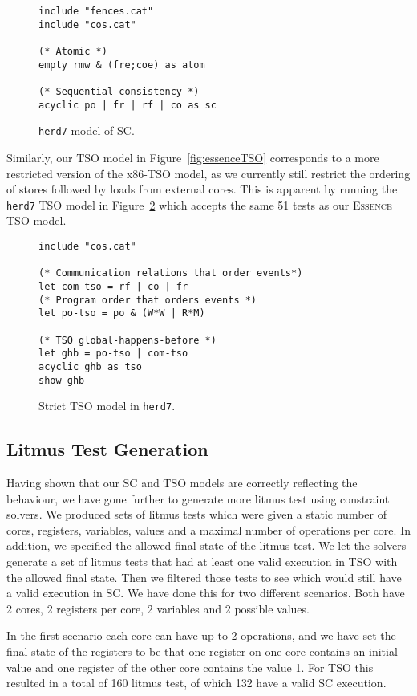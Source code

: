 \documentclass[runningheads]{llncs}
\newcommand{\essence}[0]{\textsc{Essence}}
\begin{document}
\begin{figure}
\begin{lstlisting}
include "fences.cat"
include "cos.cat"

(* Atomic *)
empty rmw & (fre;coe) as atom

(* Sequential consistency *)
acyclic po | fr | rf | co as sc
\end{lstlisting}
\caption{{\tt{herd7}} model of SC.\label{fig:herdSC}}
\end{figure}


Similarly, our TSO model in Figure~\ref{fig:essenceTSO} corresponds to a more restricted version of the x86-TSO model, as we currently still restrict the ordering of stores followed by loads from external cores.
This is apparent by running the {\tt{herd7}} TSO model in Figure~\ref{fig:herdTSO} which accepts the same 51 tests as our \essence{} TSO model.
\begin{figure}
\begin{lstlisting}
include "cos.cat"

(* Communication relations that order events*)
let com-tso = rf | co | fr
(* Program order that orders events *)
let po-tso = po & (W*W | R*M)

(* TSO global-happens-before *)
let ghb = po-tso | com-tso
acyclic ghb as tso
show ghb
\end{lstlisting}
\caption{Strict TSO model in {\tt{herd7}}.\label{fig:herdTSO}}
\end{figure}



\subsection{Litmus Test Generation}
Having shown that our SC and TSO models are correctly reflecting the behaviour, we have gone further to generate more litmus test using constraint solvers.
We produced sets of litmus tests which were given a static number of cores, registers, variables, values and a maximal number of operations per core.
In addition, we specified the allowed final state of the litmus test.
We let the solvers generate a set of litmus tests that had at least one valid execution in TSO with the allowed final state.
Then we filtered those tests to see which would still have a valid execution in SC.
We have done this for two different scenarios.
Both have 2 cores, 2 registers per core, 2 variables and 2 possible values.

In the first scenario each core can have up to 2 operations, and we have set the final state of the registers to be that one register on one core contains an initial value and one register of the other core contains the value 1.
For TSO this resulted in a total of 160 litmus test, of which 132 have a valid SC execution.
\end{document}
